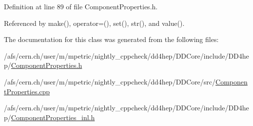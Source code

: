 Definition at line 89 of file Component\+Properties.\+h.



Referenced by make(), operator=(), set(), str(), and value().



The documentation for this class was generated from the following files\+:\begin{DoxyCompactItemize}
\item 
/afs/cern.\+ch/user/m/mpetric/nightly\+\_\+cppcheck/dd4hep/\+D\+D\+Core/include/\+D\+D4hep/\hyperlink{_component_properties_8h}{Component\+Properties.\+h}\item 
/afs/cern.\+ch/user/m/mpetric/nightly\+\_\+cppcheck/dd4hep/\+D\+D\+Core/src/\hyperlink{_component_properties_8cpp}{Component\+Properties.\+cpp}\item 
/afs/cern.\+ch/user/m/mpetric/nightly\+\_\+cppcheck/dd4hep/\+D\+D\+Core/include/\+D\+D4hep/\hyperlink{_component_properties__inl_8h}{Component\+Properties\+\_\+inl.\+h}\end{DoxyCompactItemize}
